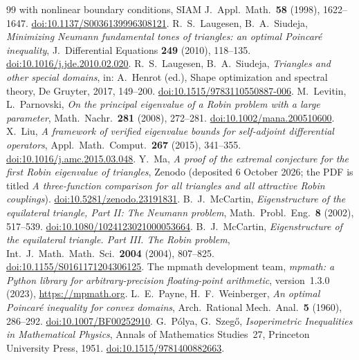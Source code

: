 \documentclass[11pt]{article}
\theoremstyle{remark}
\begin{document}
\begin{thebibliography}{99}
{with nonlinear boundary conditions}, SIAM J.\ Appl.\ Math.\ \textbf{58} (1998), 1622--1647.
\href{https://doi.org/10.1137/S0036139996308121}{doi:10.1137/S0036139996308121}.
 R.~S.~Laugesen, B.~A.~Siudeja, \emph{Minimizing Neumann fundamental tones of
triangles: an optimal Poincar\'e inequality}, J.\ Differential Equations \textbf{249} (2010), 118--135.
\href{https://doi.org/10.1016/j.jde.2010.02.020}{doi:10.1016/j.jde.2010.02.020}.
 R.~S.~Laugesen, B.~A.~Siudeja, \emph{Triangles and other special domains}, in:
A.~Henrot (ed.), Shape optimization and spectral theory, De Gruyter, 2017, 149--200.
\href{https://doi.org/10.1515/9783110550887-006}{doi:10.1515/9783110550887-006}.
 M.~Levitin, L.~Parnovski, \emph{On the principal eigenvalue of a Robin problem with a large
parameter}, Math.\ Nachr.\ \textbf{281} (2008), 272--281.
\href{https://doi.org/10.1002/mana.200510600}{doi:10.1002/mana.200510600}.
 X.~Liu, \emph{A framework of verified eigenvalue bounds for self-adjoint differential
operators}, Appl.\ Math.\ Comput.\ \textbf{267} (2015), 341--355.
\href{https://doi.org/10.1016/j.amc.2015.03.048}{doi:10.1016/j.amc.2015.03.048}.
 Y.~Ma, \emph{A proof of the extremal conjecture for the first Robin eigenvalue of
triangles}, Zenodo (deposited 6 October 2026; the PDF is titled \emph{A three-function comparison for
all triangles and all attractive Robin couplings}).
\href{https://doi.org/10.5281/zenodo.23191831}{doi:10.5281/zenodo.23191831}.
 B.~J.~McCartin, \emph{Eigenstructure of the equilateral triangle, Part II: The
Neumann problem}, Math.\ Probl.\ Eng.\ \textbf{8} (2002), 517--539.
\href{https://doi.org/10.1080/1024123021000053664}{doi:10.1080/1024123021000053664}.
 B.~J.~McCartin, \emph{Eigenstructure of the equilateral triangle. Part III. The Robin
problem}, Int.\ J.\ Math.\ Math.\ Sci.\ \textbf{2004} (2004), 807--825.
\href{https://doi.org/10.1155/S0161171204306125}{doi:10.1155/S0161171204306125}.
 The mpmath development team, \emph{mpmath: a Python library for arbitrary-precision
floating-point arithmetic}, version~1.3.0 (2023), \url{https://mpmath.org}.
 L.~E.~Payne, H.~F.~Weinberger, \emph{An optimal Poincar\'e inequality for convex domains},
Arch.\ Rational Mech.\ Anal.\ \textbf{5} (1960), 286--292.
\href{https://doi.org/10.1007/BF00252910}{doi:10.1007/BF00252910}.
 G.~P\'olya, G.~Szeg\H{o}, \emph{Isoperimetric Inequalities in Mathematical Physics}, Annals
of Mathematics Studies~27, Princeton University Press, 1951.
\href{https://doi.org/10.1515/9781400882663}{doi:10.1515/9781400882663}.
\end{thebibliography}
\end{document}
